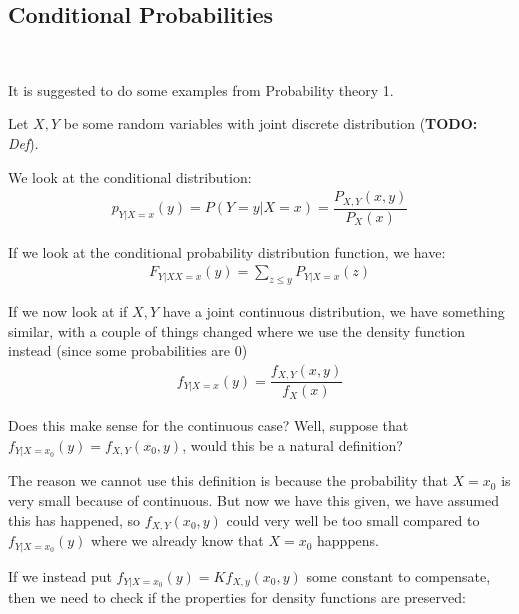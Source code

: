 \subsection{Conditional Probabilities}\hfill\\
\par\bigskip
\noindent It is suggested to do some examples from Probability theory 1.
\par\bigskip
\noindent Let $X,Y$ be some random variables with joint discrete distribution (\textbf{TODO:}\textit{ Def}).\par
\noindent We look at the conditional distribution:
\begin{equation*}
  \begin{gathered}
    p_{Y|X=x}(y) = P(Y=y|X=x) = \dfrac{P_{X,Y}(x,y)}{P_X(x)}
  \end{gathered}
\end{equation*}
\par\bigskip
\noindent If we look at the conditional probability distribution function, we have: 
\begin{equation*}
  \begin{gathered}
    F_{Y|XX=x}(y) = \sum_{z\leq y}P_{Y|X =x}(z)
  \end{gathered}
\end{equation*}
\par\bigskip
\noindent If we now look at if $X,Y$ have a joint continuous distribution, we have something similar, with a couple of things changed where we use the density function instead (since some probabilities are 0)
\begin{equation*}
  \begin{gathered}
    f_{Y|X=x}(y) = \dfrac{f_{X,Y}(x,y)}{f_{X}(x)}
  \end{gathered}
\end{equation*}
\par\bigskip
\noindent Does this make sense for the continuous case? Well, suppose that $f_{Y|X=x_0}(y) = f_{X,Y}(x_0,y)$, would this be a natural definition?\par
\noindent The reason we cannot use this definition is because the probability that $X = x_0$ is very small because of continuous. But now we have this given, we have assumed this has happened, so $f_{X,Y}(x_0,y)$ could very well be too small compared to $f_{Y|X = x_0}(y)$ where we already know that $X=x_0$ happpens.\par
\noindent If we instead put $f_{Y|X=x_0}(y) = Kf_{X,y}(x_0,y)$ some constant to compensate, then we need to check if the properties for density functions are preserved:
